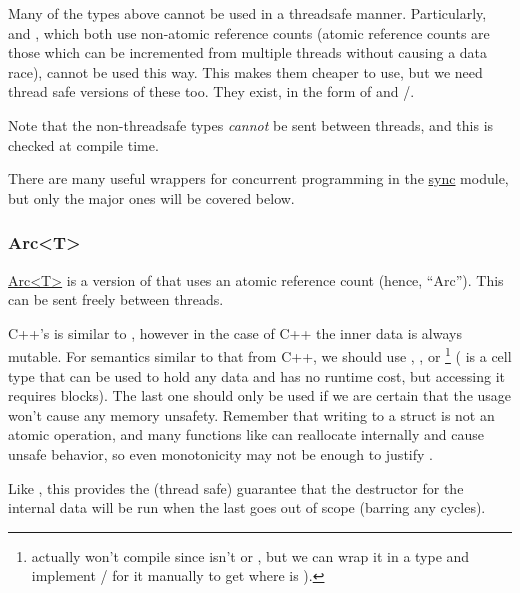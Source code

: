 Many of the types above cannot be used in a threadsafe manner. Particularly,  and , which both 
use non-atomic reference counts (atomic reference counts are those which can be incremented from multiple threads without 
causing a data race), cannot be used this way. This makes them cheaper to use, but we need thread safe versions of these too. 
They exist, in the form of  and /.

\blank

Note that the non-threadsafe types \emph{cannot} be sent between threads, and this is checked at compile time.

\blank

There are many useful wrappers for concurrent programming in the \href{https://doc.rust-lang.org/std/sync/}{sync} module, 
but only the major ones will be covered below.

\subsubsection*{Arc<T>}

\href{https://doc.rust-lang.org/std/sync/struct.Arc.html}{Arc<T>} is a version of  that uses an atomic 
reference count (hence, \enquote{Arc}). This can be sent freely between threads.

\blank

C++'s  is similar to , however in the case of C++ the inner data is always mutable. For 
semantics similar to that from C++, we should use , , or 
\footnote{ actually won't compile since  isn't 
 or , but we can wrap it in a type and implement / for it manually to get 
 where  is ).} ( is a cell 
type that can be used to hold any data and has no runtime cost, but accessing it requires  blocks). The last 
one should only be used if we are certain that the usage won't cause any memory unsafety. Remember that writing to a struct 
is not an atomic operation, and many functions like  can reallocate internally and cause unsafe behavior, 
so even monotonicity may not be enough to justify .


Like , this provides the (thread safe) guarantee that the destructor for the internal data will be run when the 
last  goes out of scope (barring any cycles).

